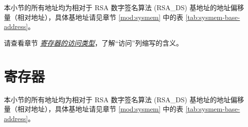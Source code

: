 \documentclass[main\_\_CN.tex]{subfiles}
\begin{document}
本小节的所有地址均为相对于 RSA 数字签名算法 (RSA\_DS) 基地址的地址偏移量（相对地址），具体基地址请见章节 \ref{mod:sysmem} \textit{} 中的表 \ref{tab:sysmem-base-address}。

请查看章节 \hyperref[glossary-access-types]{\textit{寄存器的访问类型}}，了解“访问”列缩写的含义。






\clearpage
\section{寄存器}

本小节的所有地址均为相对于 RSA 数字签名算法 (RSA\_DS) 基地址的地址偏移量（相对地址），具体基地址请见章节 \ref{mod:sysmem} \textit{} 中的表 \ref{tab:sysmem-base-address}。


\end{document}
